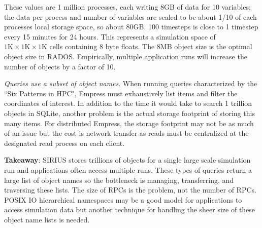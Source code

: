 These values are 1 million processes, each writing 8GB of data for 10
variables; the data per process and number of variables are scaled to be about
1/10 of each processes local storage space, so about 80GB. 100 timesteps is
close to 1 timestep every 15 minutes for 24 hours. This represents a simulation
space of \(1\text{K}\times1\text{K}\times1\text{K}\) cells containing 8 byte
floats.  The 8MB object size is the optimal object size in RADOS.  Empirically,
multiple application runs will increase the number of objects by a factor of
10.

\emph{Queries use a subset of object names}. When running queries characterized
by the ``Six Patterns in HPC", Empress must exhaustively list items and
filter the coordinates of interest.  In addition to the time it would take to
search 1 trillion objects in SQLite, another problem is the actual storage
footprint of storing this many items. For distributed Empress, the storage
footprint may not be as much of an issue but the cost is network transfer as
reads must be centralized at the designated read process on each client.

\textbf{Takeaway}: SIRIUS stores trillions of objects for a single large scale
simulation run and applications often access multiple runs. These types of
queries return a large list of object names so the bottleneck is managing,
transferring, and traversing these lists. The size of RPCs is the problem, not
the number of RPCs.  POSIX IO hierarchical namespaces may be a good model for
applications to access simulation data but another technique for handling the
sheer size of these object name lists is needed.

